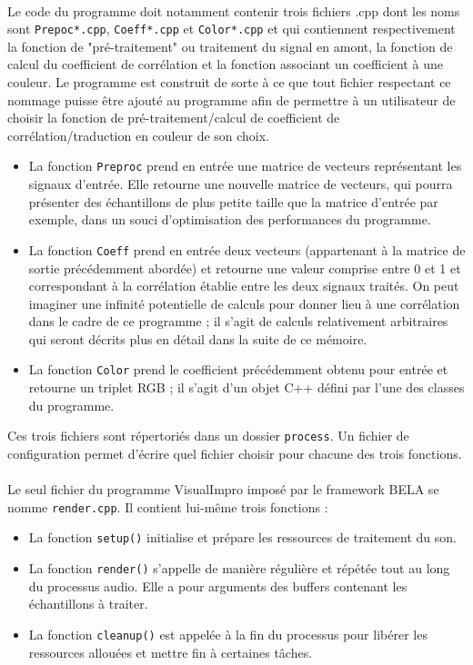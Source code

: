 \paragraph{}
Le code du programme doit notamment contenir trois fichiers .cpp dont
les noms sont \verb!Prepoc*.cpp!, \verb!Coeff*.cpp! et
\verb!Color*.cpp! et qui contiennent respectivement la fonction de
"pré-traitement" ou traitement du signal en amont, la fonction de
calcul du coefficient de corrélation et la fonction associant un
coefficient à une couleur. Le programme est construit de sorte à ce
que tout fichier respectant ce nommage puisse être ajouté au programme
afin de permettre à un utilisateur de choisir la fonction de
pré-traitement/calcul de coefficient de
corrélation/traduction en couleur de son choix.
\begin{itemize}
 \item La fonction \verb!Preproc! prend en entrée une matrice de
       vecteurs représentant les signaux d'entrée. Elle retourne une
       nouvelle matrice de vecteurs, qui pourra présenter des
       échantillons de plus petite taille que la matrice d'entrée par
       exemple, dans un souci d'optimisation des performances du
       programme.
 \item La fonction \verb!Coeff! prend en entrée deux vecteurs
       (appartenant à la matrice de sortie précédemment abordée) et
       retourne une valeur comprise entre 0 et 1 et correspondant à la
       corrélation établie entre les deux signaux traités. On peut
       imaginer une infinité potentielle de calculs pour donner lieu à
       une corrélation dans le cadre de ce programme ; il s'agit de
       calculs relativement arbitraires qui seront décrits plus en détail
       dans la suite de ce mémoire.
 \item La fonction \verb!Color! prend le coefficient précédemment obtenu
       pour entrée et retourne un triplet RGB ; il s'agit d'un objet C++
       défini par l'une des classes du programme.
\end{itemize}
Ces trois fichiers sont répertoriés dans un dossier \verb!process!. Un
fichier de configuration permet d'écrire quel fichier choisir pour
chacune des trois fonctions.

\paragraph{}
Le seul fichier du programme VisualImpro imposé par le framework BELA
se nomme \verb!render.cpp!. Il contient lui-même trois fonctions :
\begin{itemize}
 \item La fonction \verb!setup()! initialise et prépare les ressources de
       traitement du son.
 \item La fonction \verb!render()! s'appelle de manière régulière et répétée
       tout au long du processus audio. Elle a pour arguments des buffers
       contenant les échantillons à traiter.
 \item La fonction \verb!cleanup()! est appelée à la fin du processus pour
       libérer les ressources allouées et mettre fin à certaines tâches.
\end{itemize}


